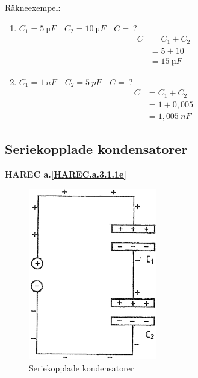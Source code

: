 Räkneexempel:
\begin{enumerate}
\item \(C_1 = 5\ µF \quad C_2 = 10\ µF \quad C =\ ?\)
  \begin{align*}
    C &= C_1 + C_2 \\
    &= 5 + 10 \\
    &= 15\ µF
  \end{align*}
\item \(C_1 = 1\ nF \quad C_2 = 5\ pF \quad C =\ ?\)
  \begin{align*}
    C &= C_1 + C_2 \\
    &= 1 + 0,005 \\
    &= 1,005\ nF
  \end{align*}
\end{enumerate}

\subsection{Seriekopplade kondensatorer}
\textbf{HAREC a.\ref{HAREC.a.3.1.1e}\label{myHAREC.a.3.1.1e}}

\begin{figure}[h]
\begin{center}
  \includegraphics[width=0.5\textwidth]{images/cropped_pdfs/bild_2_3-06.pdf}
  \caption{Seriekopplade kondensatorer}
  \label{fig:BildII3-06}
\end{center}
\end{figure}

